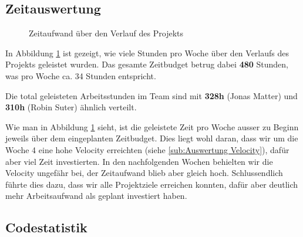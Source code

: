 \subsection{Zeitauswertung}
\label{sub:Zeitauswertung}

\begin{figure}[H]
    \centering

    \caption[Diagramm Zeitaufwand über den Verlauf des Projekts]{Zeitaufwand über den Verlauf des Projekts}
    \label{chart:Zeitauswertung}
\end{figure}

In Abbildung \ref{chart:Zeitauswertung} ist gezeigt, wie viele Stunden pro Woche über den Verlaufs des Projekts geleistet wurden. Das gesamte Zeitbudget betrug dabei \textbf{480} Stunden, was pro Woche ca. 34 Stunden entspricht.

Die total geleisteten Arbeitsstunden im Team sind mit \textbf{328h} (Jonas Matter) und \textbf{310h} (Robin Suter) ähnlich verteilt.

Wie man in Abbildung \ref{chart:Zeitauswertung} sieht, ist die geleistete Zeit pro Woche ausser zu Beginn jeweils über dem eingeplanten Zeitbudget. Dies liegt wohl daran, dass wir um die Woche 4 eine hohe Velocity erreichten (siehe \ref{sub:Auswertung Velocity}), dafür aber viel Zeit investierten. In den nachfolgenden Wochen behielten wir die Velocity ungefähr bei, der Zeitaufwand blieb aber gleich hoch. Schlussendlich führte dies dazu, dass wir alle Projektziele erreichen konnten, dafür aber deutlich mehr Arbeitsaufwand als geplant investiert haben.

\subsection{Codestatistik}
\label{sub:Codestatistik}

